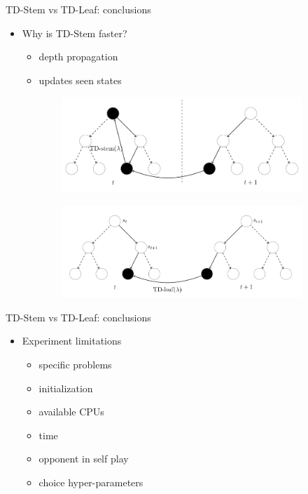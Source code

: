 \documentclass{beamer}
\begin{document}
\begin{frame}{TD-Stem vs TD-Leaf: conclusions}
	\begin{itemize}
		\item Why is TD-Stem faster?
		\begin{itemize}
			\item depth propagation
			\item updates seen states
		\end{itemize}
	\end{itemize}
	\begin{figure}
		\begin{subfigure}{0.5\textwidth}
			\includegraphics*[scale=0.2]{abstracts/tds}
		\end{subfigure}
		\begin{subfigure}{0.5\textwidth}
			\includegraphics*[scale=0.2]{abstracts/tdl}
		\end{subfigure}
	\end{figure}
\end{frame}

\begin{frame}{TD-Stem vs TD-Leaf: conclusions}
\begin{itemize}
\item Experiment limitations
\begin{itemize}
\item specific problems
\item initialization
\item available CPUs
\item time
\item opponent in self play
\item choice hyper-parameters
\end{itemize}
\end{itemize}
\end{frame}
\end{document}
